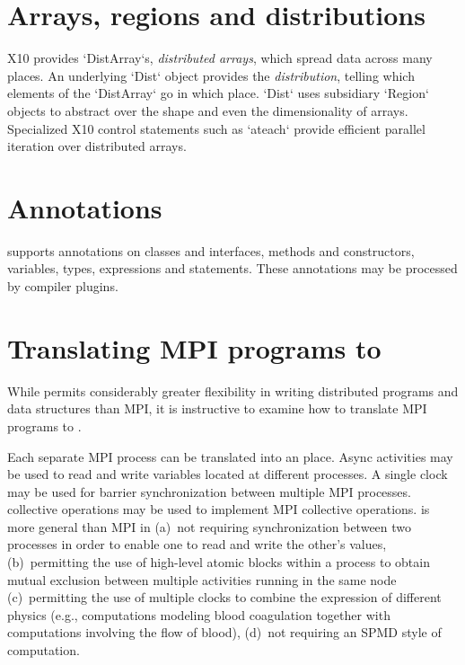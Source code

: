
\section{Arrays, regions and distributions}

X10 provides \xcd`DistArray`s, {\em distributed arrays}, which spread data
across many places. An underlying \xcd`Dist` object provides the {\em
distribution}, telling which elements of the \xcd`DistArray` go in which
place. \xcd`Dist` uses subsidiary \xcd`Region` objects to abstract over the
shape and even the dimensionality of arrays.
Specialized X10 control statements such as \xcd`ateach` provide efficient
parallel iteration over distributed arrays.


\section{Annotations}

\Xten{} supports annotations on classes and interfaces, methods
and constructors,
variables, types, expressions and statements.
These annotations may be processed by compiler plugins.

\section{Translating MPI programs to \Xten{}}

While \Xten{} permits considerably greater flexibility in writing
distributed programs and data structures than MPI, it is instructive
to examine how to translate MPI programs to \Xten.

Each separate MPI process can be translated into an \Xten{}
place. Async activities may be used to read and write variables
located at different processes. A single clock may be used for barrier
synchronization between multiple MPI processes. \Xten{} collective
operations may be used to implement MPI collective operations.
\Xten{} is more general than MPI in (a)~not requiring synchronization
between two processes in order to enable one to read and write the
other's values, (b)~permitting the use of high-level atomic blocks
within a process to obtain mutual exclusion between multiple
activities running in the same node (c)~permitting the use of multiple
clocks to combine the expression of different physics (e.g.,
computations modeling blood coagulation together with computations
involving the flow of blood), (d)~not requiring an SPMD style of
computation.



